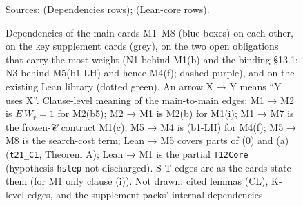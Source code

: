 \begin{figure}[p]
\caption{Dependencies of the main cards M1–M8 (blue boxes) on each other, on the key supplement cards (grey), on the two open obligations that carry the most weight (N1 behind M1(b) and the binding §13.1; N3 behind M5(b1-LH) and hence M4(f); dashed purple), and on the existing Lean library (dotted green). An arrow X → Y means ``Y uses X''. Clause-level meaning of the main-to-main edges: M1 → M2 is $E\,W_r=1$ for M2(b5); M2 → M1 is M2(b) for M1(i); M1 → M7 is the frozen-𝒞 contract M1(c); M5 → M4 is (b1-LH) for M4(f); M5 → M8 is the search-cost term; Lean → M5 covers parts of (0) and (a) (\texttt{t21\_C1}, Theorem A); Lean → M1 is the partial \texttt{T12Core} (hypothesis \texttt{hstep} not discharged). S-T edges are as the cards state them (for M1 only clause (i)). Not drawn: cited lemmas (CL), K-level edges, and the supplement packs' internal dependencies.}
\label{fig:depgraph}
\par\footnotesize Sources:  (Dependencies rows);  (Lean-core rows).
\end{figure}
